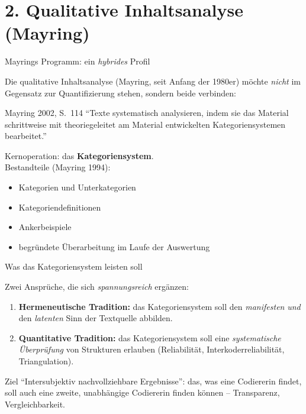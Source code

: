 \documentclass[aspectratio=169,11pt]{beamer}
\let\oldemph\emph
\renewcommand{\emph}[1]{{\color{solCyan}\oldemph{#1}}}
\let\oldtextbf\textbf
\renewcommand{\textbf}[1]{{\color{solBase3}\oldtextbf{#1}}}
\begin{document}
\section{2. Qualitative Inhaltsanalyse (Mayring)}

\begin{frame}{Mayrings Programm: ein \emph{hybrides} Profil}

  Die qualitative Inhaltsanalyse (Mayring, seit Anfang der 1980er)
  möchte \emph{nicht} im Gegensatz zur Quantifizierung stehen,
  sondern beide verbinden:

  \vfill
  \begin{block}{Mayring 2002, S.~114}
    \enquote{Texte systematisch analysieren, indem sie das Material
    schrittweise mit theoriegeleitet am Material entwickelten
    Kategoriensystemen bearbeitet.}
  \end{block}

  \vfill
  Kernoperation: das \textbf{Kategoriensystem}. \\[4pt]
  Bestandteile (Mayring 1994):
  \begin{itemize}
    \item Kategorien und Unterkategorien
    \item Kategoriendefinitionen
    \item Ankerbeispiele
    \item begründete Überarbeitung im Laufe der Auswertung
  \end{itemize}

\end{frame}

\begin{frame}{Was das Kategoriensystem leisten soll}

  Zwei Ansprüche, die sich \emph{spannungsreich} ergänzen:

  \vfill
  \begin{enumerate}
    \item \textbf{Hermeneutische Tradition:}
          das Kategoriensystem soll den \emph{manifesten} \emph{und}
          den \emph{latenten} Sinn der Textquelle abbilden.
    \vfill
    \item \textbf{Quantitative Tradition:}
          das Kategoriensystem soll eine \emph{systematische
          Überprüfung} von Strukturen erlauben (Reliabilität,
          Interkoderreliabilität, Triangulation).
  \end{enumerate}

  \vfill
  \begin{block}{Ziel}
    \enquote{Intersubjektiv nachvollziehbare Ergebnisse}: das, was
    eine Codiererin findet, soll auch eine zweite, unabhängige
    Codiererin finden können – Transparenz, Vergleichbarkeit.
  \end{block}

\end{frame}
\end{document}
